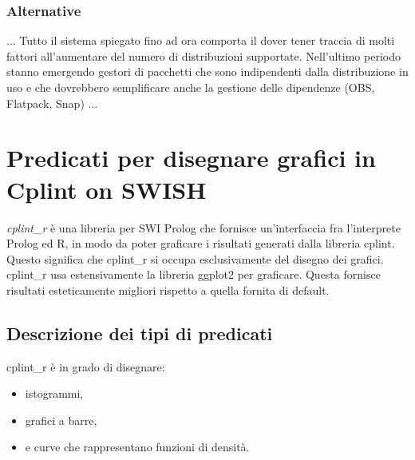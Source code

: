 \documentclass[10pt,titlepage,twoside,a4paper]{report}
\begin{document}
\subsection{Alternative}
... Tutto il sistema spiegato fino ad ora comporta il dover tener traccia di 
molti fattori all'aumentare del numero di distribuzioni supportate. Nell'ultimo 
periodo stanno emergendo gestori di pacchetti che sono indipendenti dalla 
distribuzione in uso e che dovrebbero semplificare anche la gestione delle 
dipendenze (OBS, Flatpack, Snap) ...




\chapter{Predicati per disegnare grafici in Cplint on SWISH} 
\label{predicati-per-disegnare-grafici-in-cplint-on-swish}
\emph{cplint\_r} è una libreria per SWI Prolog che fornisce un'interfaccia 
fra l'interprete Prolog ed R, in modo da poter graficare i risultati generati 
dalla libreria cplint. Questo significa che cplint\_r si occupa esclusivamente 
del disegno dei grafici. cplint\_r usa estensivamente la libreria ggplot2 per 
graficare. Questa fornisce risultati esteticamente migliori rispetto a quella 
fornita di default.

\section{Descrizione dei tipi di predicati}
cplint\_r è in grado di disegnare:
\begin{itemize}
    \item istogrammi,
    \item grafici a barre,
    \item e curve che rappresentano funzioni di densità.
\end{itemize}
\end{document}
